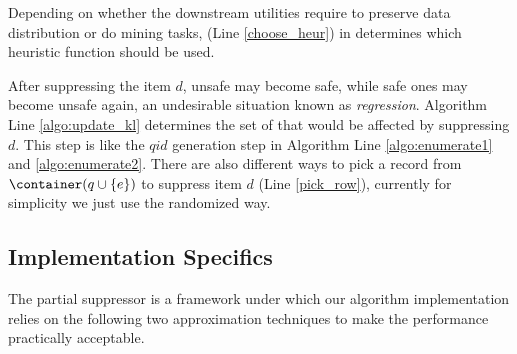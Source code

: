 %

 Depending on whether the downstream utilities require to preserve
 data distribution or do mining tasks,
 \SuppressionPolicy (Line \ref{choose_heur}) in \SanitizeBuffer determines
 which heuristic function should be used.

After suppressing the item $d$, unsafe \qids may become safe, while safe ones
may become unsafe again, an undesirable situation known as {\em regression}.
Algorithm \SanitizeBuffer Line \ref{algo:update_kl} determines the set of
\qids that would be affected by suppressing $d$. This step is like the $qid$
generation step in Algorithm \PartialSuppressor Line \ref{algo:enumerate1}
and \ref{algo:enumerate2}.
 There are also different ways to pick a
record from $\container(q\cup \{e\})$ to suppress item $d$ (Line
\ref{pick_row}), currently for simplicity we just use the randomized way.

\subsection{Implementation Specifics}
\label{algo:impmentation}
The partial suppressor is a framework under which our algorithm
implementation relies on the following two approximation techniques to make
the performance practically acceptable.

